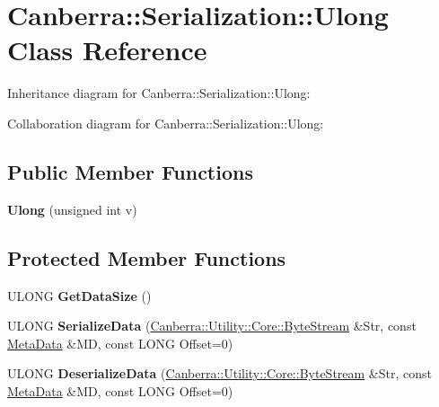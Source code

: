 \hypertarget{class_canberra_1_1_serialization_1_1_ulong}{}\section{Canberra\+:\+:Serialization\+:\+:Ulong Class Reference}
\label{class_canberra_1_1_serialization_1_1_ulong}


Inheritance diagram for Canberra\+:\+:Serialization\+:\+:Ulong\+:


Collaboration diagram for Canberra\+:\+:Serialization\+:\+:Ulong\+:
\subsection*{Public Member Functions}
\begin{DoxyCompactItemize}
\item 
\mbox{\label{class_canberra_1_1_serialization_1_1_ulong_a9f4b145599df040e5371aade499c52ae}} 
{\bfseries Ulong} (unsigned int v)
\end{DoxyCompactItemize}
\subsection*{Protected Member Functions}
\begin{DoxyCompactItemize}
\item 
\mbox{\label{class_canberra_1_1_serialization_1_1_ulong_adc415c0ed5f3bff6de10841839c79872}} 
U\+L\+O\+NG {\bfseries Get\+Data\+Size} ()
\item 
\mbox{\label{class_canberra_1_1_serialization_1_1_ulong_a63f09da5eddae750a127b3ca4511305a}} 
U\+L\+O\+NG {\bfseries Serialize\+Data} (\hyperlink{class_canberra_1_1_utility_1_1_core_1_1_byte_stream}{Canberra\+::\+Utility\+::\+Core\+::\+Byte\+Stream} \&Str, const \hyperlink{class_canberra_1_1_serialization_1_1_meta_data}{Meta\+Data} \&MD, const L\+O\+NG Offset=0)
\item 
\mbox{\label{class_canberra_1_1_serialization_1_1_ulong_acac62d4fbdd61702fb0d49261acdc0fc}} 
U\+L\+O\+NG {\bfseries Deserialize\+Data} (\hyperlink{class_canberra_1_1_utility_1_1_core_1_1_byte_stream}{Canberra\+::\+Utility\+::\+Core\+::\+Byte\+Stream} \&Str, const \hyperlink{class_canberra_1_1_serialization_1_1_meta_data}{Meta\+Data} \&MD, const L\+O\+NG Offset=0)
\end{DoxyCompactItemize}
